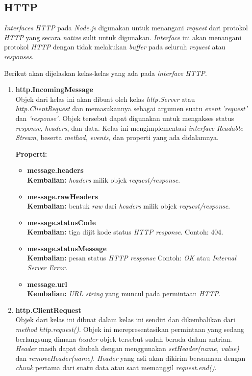 \subsection{HTTP}
\textit{Interfaces} \textit{HTTP} pada \textit{Node.js} digunakan untuk menangani \textit{request} dari protokol \textit{HTTP} yang secara \textit{native} sulit untuk digunakan. \textit{Interface} ini akan menangani protokol \textit{HTTP} dengan tidak melakukan \textit{buffer} pada seluruh \textit{request} atau \textit{responses}.

Berikut akan dijelaskan kelas-kelas yang ada pada \textit{interface} \textit{HTTP}.

\begin{enumerate}
	\item \textbf{http.IncomingMessage} \\ 
	Objek dari kelas ini akan dibuat oleh kelas \textit{http.Server} atau \textit{http.ClientRequest} dan memasukannya sebagai argumen suatu \textit{event} \textit{'request'} dan \textit{'response'}. Objek tersebut dapat digunakan untuk mengakses status \textit{response}, \textit{headers}, dan data. Kelas ini mengimplementasi \textit{interface Readable Stream}, beserta \textit{method, events,} dan properti yang ada didalamnya.
	
	\textbf{Properti:}
	\begin{itemize}
		\item \textbf{message.headers} \\ \textbf{Kembalian:} \textit{headers} milik objek \textit{request/response.}
		\item \textbf{message.rawHeaders} \\ \textbf{Kembalian:} bentuk \textit{raw} dari \textit{headers} milik objek \textit{request/response}.
		\item \textbf{message.statusCode} \\ \textbf{Kembalian:} tiga dijit kode status \textit{HTTP response}. Contoh: 404.
		\item \textbf{message.statusMessage} \\ \textbf{Kembalian:} pesan status \textit{HTTP response} Contoh: \textit{OK} atau \textit{Internal Server Error.}
		\item \textbf{message.url} \\ \textbf{Kembalian:} \textit{URL string} yang muncul pada permintaan \textit{HTTP}.
	\end{itemize}

	\item \textbf{http.ClientRequest} \\ 
	Objek dari kelas ini dibuat dalam kelas ini sendiri dan dikembalikan dari \textit{method http.request()}. Objek ini merepresentasikan permintaan yang sedang berlangsung dimana \textit{header} objek tersebut sudah berada dalam antrian. \textit{Header} masih dapat diubah dengan menggunakan \textit{setHeader(name, value)} dan \textit{removeHeader(name)}. \textit{Header} yang asli akan dikirim bersamaan dengan \textit{chunk} pertama dari suatu data atau saat memanggil \textit{request.end()}.
	

\end{enumerate}
